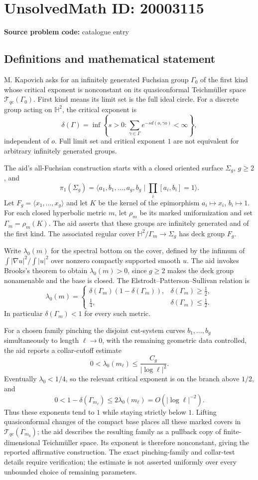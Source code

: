 \documentclass[11pt]{article}
\begin{document}
\section*{UnsolvedMath ID: 20003115}
\textbf{Source problem code:} catalogue entry
\subsection{Definitions and mathematical statement}
M. Kapovich asks for an infinitely generated Fuchsian group $\Gamma_0$ of the first kind whose critical exponent is nonconstant on its quasiconformal Teichm\"uller space $\mathcal T_{qc}(\Gamma_0)$. First kind means its limit set is the full ideal circle. For a discrete group acting on $\mathbb H^2$, the critical exponent is
\[
\delta(\Gamma)=\inf\left\{s>0:\sum_{\gamma\in\Gamma}e^{-s d(o,\gamma o)}<\infty\right\},
\]
independent of $o$. Full limit set and critical exponent $1$ are not equivalent for arbitrary infinitely generated groups.

The aid's all-Fuchsian construction starts with a closed oriented surface $\Sigma_g$, $g\geq2$, and
\[
\pi_1(\Sigma_g)=\langle a_1,b_1,\ldots,a_g,b_g\mid\prod_i[a_i,b_i]=1\rangle.
\]
Let $F_g=\langle x_1,\ldots,x_g\rangle$ and let $K$ be the kernel of the epimorphism $a_i\mapsto x_i$, $b_i\mapsto1$. For each closed hyperbolic metric $m$, let $\rho_m$ be its marked uniformization and set $\Gamma_m=\rho_m(K)$. The aid asserts that these groups are infinitely generated and of the first kind. The associated regular cover $\mathbb H^2/\Gamma_m\to\Sigma_g$ has deck group $F_g$.

Write $\lambda_0(m)$ for the spectral bottom on the cover, defined by the infimum of $\int|\nabla u|^2/\int|u|^2$ over nonzero compactly supported smooth $u$. The aid invokes Brooks's theorem to obtain $\lambda_0(m)>0$, since $g\geq2$ makes the deck group nonamenable and the base is closed. The Elstrodt--Patterson--Sullivan relation is
\[
\lambda_0(m)=
\begin{cases}
\delta(\Gamma_m)(1-\delta(\Gamma_m)),&\delta(\Gamma_m)\geq\tfrac12,\\
\tfrac14,&\delta(\Gamma_m)\leq\tfrac12.
\end{cases}
\]
In particular $\delta(\Gamma_m)<1$ for every such metric.

For a chosen family pinching the disjoint cut-system curves $b_1,\ldots,b_g$ simultaneously to length $\ell\to0$, with the remaining geometric data controlled, the aid reports a collar-cutoff estimate
\[
0<\lambda_0(m_\ell)\leq\frac{C_g}{|\log\ell|^2}.
\]
Eventually $\lambda_0<1/4$, so the relevant critical exponent is on the branch above $1/2$, and
\[
0<1-\delta(\Gamma_{m_\ell})\leq2\lambda_0(m_\ell)
=O(|\log\ell|^{-2}).
\]
Thus these exponents tend to $1$ while staying strictly below $1$. Lifting quasiconformal changes of the compact base places all these marked covers in $\mathcal T_{qc}(\Gamma_{m_0})$; the aid describes the resulting family as a pullback copy of finite-dimensional Teichm\"uller space. Its exponent is therefore nonconstant, giving the reported affirmative construction. The exact pinching-family and collar-test details require verification; the estimate is not asserted uniformly over every unbounded choice of remaining parameters.
\end{document}
